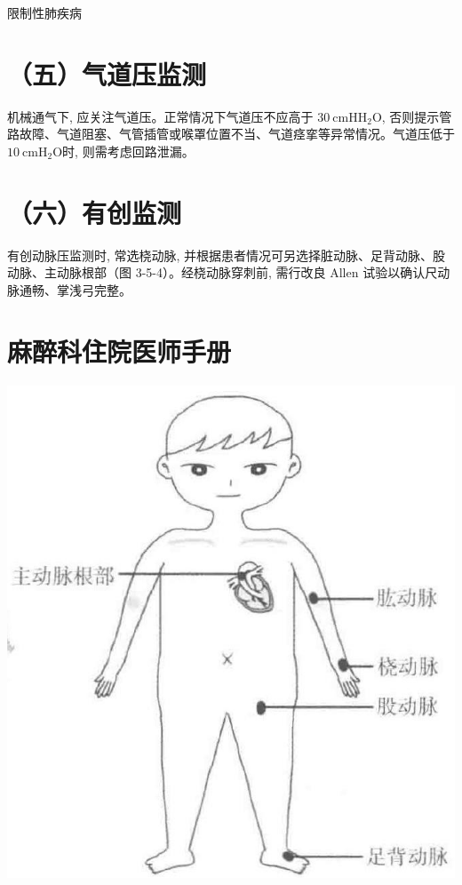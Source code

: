 \documentclass[10pt]{article}
\begin{document}
限制性肺疾病

\section*{（五）气道压监测}
机械通气下, 应关注气道压。正常情况下气道压不应高于 $30 \mathrm{~cm} \mathrm{H} \mathrm{H}_{2} \mathrm{O}$, 否则提示管路故障、气道阻塞、气管插管或喉罩位置不当、气道痉挛等异常情况。气道压低于 $10 \mathrm{~cm} \mathrm{H}_{2} \mathrm{O}$时, 则需考虑回路泄漏。

\section*{（六）有创监测}
有创动脉压监测时, 常选桡动脉, 并根据患者情况可另选择脏动脉、足背动脉、股动脉、主动脉根部（图 3-5-4）。经桡动脉穿刺前, 需行改良 Allen 试验以确认尺动脉通畅、掌浅弓完整。

\section*{麻醉科住院医师手册}
\begin{center}
\includegraphics[max width=\textwidth]{2024_07_05_645bb794a4d4f32ee0c8g-102}
\end{center}
\end{document}

